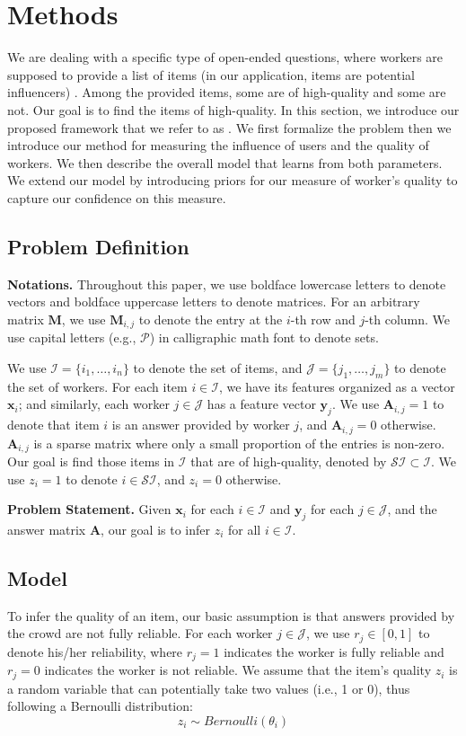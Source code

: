 \section{Methods}
We are dealing with a specific type of open-ended questions, where workers are supposed to provide a list of items
(in our application, items are potential influencers) . 
Among the provided items, some are of high-quality and some are not. Our goal is to find the items of high-quality. 
In this section, we introduce our proposed framework that we refer to as
\sys. We first formalize the problem then we introduce our method for
 measuring the influence of users and the quality of workers. 
 We then describe the overall model that learns from both parameters.
 We extend our model by introducing priors for our measure of worker's quality to
 capture our confidence  on this measure.
\subsection{Problem Definition}
\smallskip
\noindent\textbf{Notations.} Throughout this paper, we use boldface lowercase letters to denote vectors and boldface uppercase letters to denote matrices. For an arbitrary matrix $\mathbf{M}$, we use $\mathbf{M}_{i,j}$ to denote the entry at the $i$-th row and $j$-th column. We use capital letters (e.g., $\mathcal{P}$) in calligraphic math font to denote sets.

We use $\mathcal{I} = \{i_1, \ldots, i_n\}$ to denote the set of items, and  $\mathcal{J} = \{j_1, \ldots, j_m \}$ to denote the set of workers. For each item $i \in \mathcal{I}$, we have its features organized as a vector $\mathbf{x}_i$; and similarly, each worker $j \in \mathcal{J}$ has a feature vector $\mathbf{y}_j$. We use $\mathbf{A}_{i,j}=1$ to denote that item $i$ is an answer provided by worker $j$, and $\mathbf{A}_{i,j}=0$ otherwise. $\mathbf{A}_{i,j}$ is a sparse matrix where only a small proportion of the entries is non-zero. Our goal is find those items in $\mathcal{I}$ that are of high-quality, denoted by $\mathcal{SI} \subset \mathcal{I}$. We use $z_i = 1$ to denote $i\in \mathcal{SI}$, and $z_i = 0$ otherwise.

\smallskip
\noindent\textbf{Problem Statement.} Given $\mathbf{x}_i$ for each $i\in \mathcal{I}$ and $\mathbf{y}_j$ for each $j\in \mathcal{J}$, and the answer matrix $\mathbf{A}$, our goal is to infer $z_i$ for all $i\in \mathcal{I}$.
\subsection{Model}
To infer the quality of an item, our basic assumption is that answers provided by the crowd are not fully reliable. For each worker $j\in \mathcal{J}$, we use $r_j \in [0,1]$ to denote his/her reliability, where $r_j=1$ indicates the worker is fully reliable and $r_j=0$ indicates the worker is not reliable.
We assume that the item's quality $z_i$ is a random variable that can potentially take two values (i.e., 1 or 0), thus following a Bernoulli distribution:
\begin{equation}
    z_i \sim Bernoulli(\theta_i)
    \label{eq:dis_item}
\end{equation}

